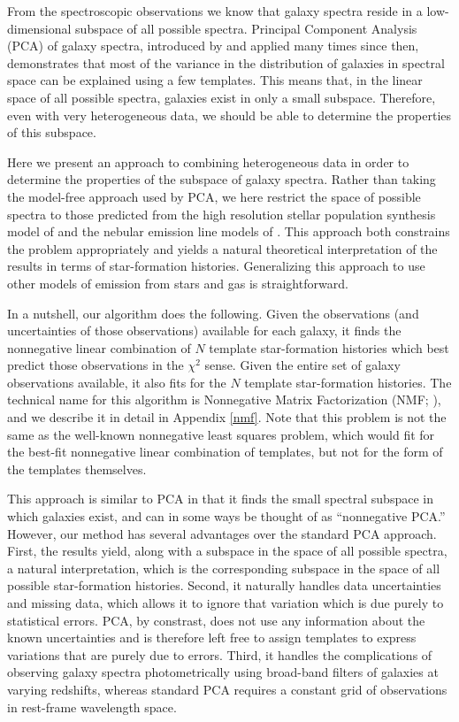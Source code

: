 \documentclass[10pt,preprint]{aastex}
\begin{document}
From the spectroscopic observations we know that galaxy spectra reside
in a low-dimensional subspace of all possible spectra. Principal
Component Analysis (PCA) of galaxy spectra, introduced by
\citet{connolly95b} and applied many times since then, demonstrates
that most of the variance in the distribution of galaxies in spectral
space can be explained using a few templates. This means that, in the
linear space of all possible spectra, galaxies exist in only a small
subspace. Therefore, even with very heterogeneous data, we should be
able to determine the properties of this subspace.

Here we present an approach to combining heterogeneous data in order
to determine the properties of the subspace of galaxy spectra. Rather
than taking the model-free approach used by PCA, we here restrict the
space of possible spectra to those predicted from the high resolution
stellar population synthesis model of \citet{bruzual03a} and the
nebular emission line models of \citet{kewley01a}.  This approach both
constrains the problem appropriately and yields a natural theoretical
interpretation of the results in terms of star-formation
histories. Generalizing this approach to use other models of emission
from stars and gas is straightforward.

In a nutshell, our algorithm does the following. Given the
observations (and uncertainties of those observations) available for
each galaxy, it finds the nonnegative linear combination of $N$
template star-formation histories which best predict those
observations in the $\chi^2$ sense. Given the entire set of galaxy
observations available, it also fits for the $N$ template
star-formation histories. The technical name for this algorithm is
Nonnegative Matrix Factorization (NMF; \citealt{lee99a, lee00a}), and
we describe it in detail in Appendix \ref{nmf}. Note that this problem
is not the same as the well-known nonnegative least squares problem,
which would fit for the best-fit nonnegative linear combination of
templates, but not for the form of the templates themselves.

This approach is similar to PCA in that it finds the small spectral
subspace in which galaxies exist, and can in some ways be thought of
as ``nonnegative PCA.''  However, our method has several advantages
over the standard PCA approach. First, the results yield, along with a
subspace in the space of all possible spectra, a natural
interpretation, which is the corresponding subspace in the space of
all possible star-formation histories. Second, it naturally handles
data uncertainties and missing data, which allows it to ignore that
variation which is due purely to statistical errors. PCA, by
constrast, does not use any information about the known uncertainties
and is therefore left free to assign templates to express variations
that are purely due to errors. Third, it handles the complications of
observing galaxy spectra photometrically using broad-band filters of
galaxies at varying redshifts, whereas standard PCA requires a
constant grid of observations in rest-frame wavelength space.
\end{document}
